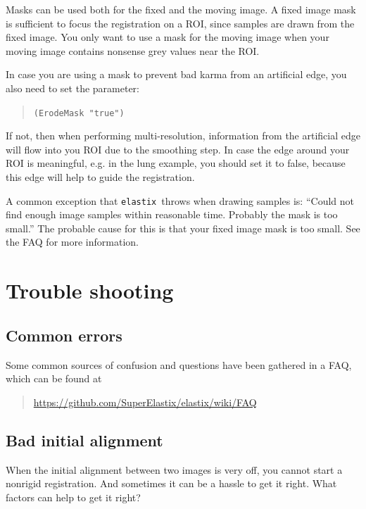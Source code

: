 \documentclass[]{report}
\newcommand{\elastix}{\texttt{elastix}}
\begin{document}
Masks can be used both for the fixed and the moving image. A fixed
image mask is sufficient to focus the registration on a ROI, since
samples are drawn from the fixed image. You only want to use a
mask for the moving image when your moving image contains nonsense
grey values near the ROI.

In case you are using a mask to prevent bad karma from an artificial
edge, you also need to set the parameter:
\begin{quote}
\texttt{(ErodeMask "true")}
\end{quote}
If not, then when performing multi-resolution, information from the
artificial edge will flow into you ROI due to the smoothing step. In
case the edge around your ROI is meaningful, e.g. in the lung
example, you should set it to false, because this edge will help to
guide the registration.

A common exception that \elastix\ throws when drawing samples is:
``Could not find enough image samples within reasonable time.
Probably the mask is too small.'' The probable cause for this is
that your fixed image mask is too small. See the FAQ for more
information.

\section{Trouble shooting}

\subsection{Common errors}

Some common sources of confusion and questions have been gathered in
a FAQ, which can be found at
\begin{quote}
\url{https://github.com/SuperElastix/elastix/wiki/FAQ}
\end{quote}

\subsection{Bad initial alignment}

When the initial alignment between two images is very off, you cannot
start a nonrigid registration. And sometimes it can be a hassle to
get it right. What factors can help to get it right?
\end{document}
